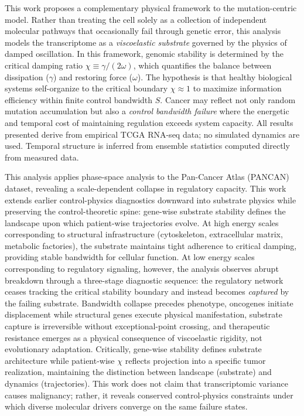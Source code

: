 \documentclass[11pt,letterpaper]{article}
\begin{document}
This work proposes a complementary physical framework to the mutation-centric model. Rather than treating the cell solely as a collection of independent molecular pathways that occasionally fail through genetic error, this analysis models the transcriptome as a \textit{viscoelastic substrate} governed by the physics of damped oscillation. In this framework, genomic stability is determined by the critical damping ratio $\chi \equiv \gamma/(2\omega)$, which quantifies the balance between dissipation ($\gamma$) and restoring force ($\omega$). The hypothesis is that healthy biological systems self-organize to the critical boundary $\chi \approx 1$ to maximize information efficiency within finite control bandwidth $S$. Cancer may reflect not only random mutation accumulation but also a \textit{control bandwidth failure} where the energetic and temporal cost of maintaining regulation exceeds system capacity. All results presented derive from empirical TCGA RNA-seq data; no simulated dynamics are used. Temporal structure is inferred from ensemble statistics computed directly from measured data.

This analysis applies phase-space analysis to the Pan-Cancer Atlas (PANCAN) dataset, revealing a scale-dependent collapse in regulatory capacity. This work extends earlier control-physics diagnostics downward into substrate physics while preserving the control-theoretic spine: gene-wise substrate stability defines the landscape upon which patient-wise trajectories evolve. At high energy scales corresponding to structural infrastructure (cytoskeleton, extracellular matrix, metabolic factories), the substrate maintains tight adherence to critical damping, providing stable bandwidth for cellular function. At low energy scales corresponding to regulatory signaling, however, the analysis observes abrupt breakdown through a three-stage diagnostic sequence: the regulatory network ceases tracking the critical stability boundary and instead becomes \textit{captured} by the failing substrate. Bandwidth collapse precedes phenotype, oncogenes initiate displacement while structural genes execute physical manifestation, substrate capture is irreversible without exceptional-point crossing, and therapeutic resistance emerges as a physical consequence of viscoelastic rigidity, not evolutionary adaptation. Critically, gene-wise stability defines substrate architecture while patient-wise $\chi$ reflects projection into a specific tumor realization, maintaining the distinction between landscape (substrate) and dynamics (trajectories). This work does not claim that transcriptomic variance causes malignancy; rather, it reveals conserved control-physics constraints under which diverse molecular drivers converge on the same failure states.
\end{document}
